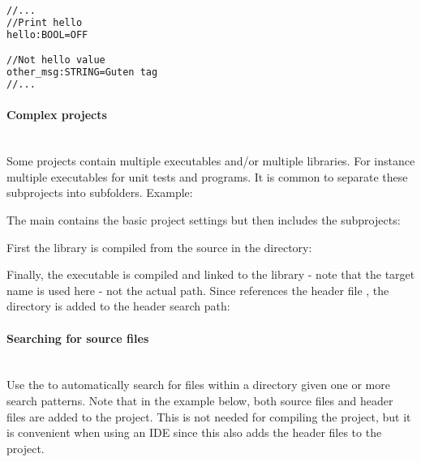 \documentclass[11pt,a4paper,landscape]{scrartcl} %
\newcommand{\sectiontitle}[1]{\paragraph{#1} \ \\} %
\begin{document}
\begin{multicols}{2}
\begin{lstlisting}[language=bash]
//...
//Print hello
hello:BOOL=OFF

//Not hello value
other_msg:STRING=Guten tag
//...
\end{lstlisting}

\sectiontitle{Complex projects}

Some projects contain multiple executables and/or multiple libraries. For instance multiple executables for unit tests and programs. It is common to separate these subprojects into subfolders. Example:

\vspace{\baselineskip} %
\noindent{}

\vspace{\baselineskip} %

The main  contains the basic project settings but then includes the subprojects:



First the library  is compiled from the source in the   directory:



Finally, the executable  is compiled and linked to the  library - note that the target name is used here - not the actual path. Since  references the header file , the  directory is added to the header search path:



\sectiontitle{Searching for source files}

Use the  to automatically search for files within a directory given one or more search patterns. Note that in the example below, both source files and header files are added to the project. This is not needed for compiling the project, but it is convenient when using an IDE since this also adds the header files to the project.


\end{multicols}
\end{document}
